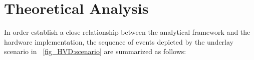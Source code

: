

\section{Theoretical Analysis}
\label{model}
In order establish a close relationship between the analytical framework and the hardware implementation, the sequence of events depicted by the underlay scenario in \figurename~\ref{fig_HVD:scenario} are summarized as follows:

